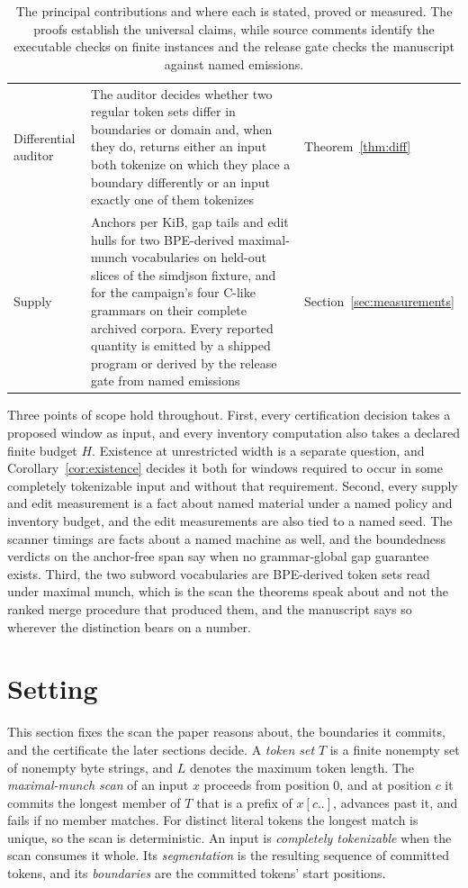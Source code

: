 \documentclass[11pt,a4paper]{article}
\theoremstyle{definition}
\theoremstyle{plain}
\begin{document}
\begin{table}[!htbp]
\begin{tabular}{L{2.9cm}L{8.4cm}L{3.3cm}}
\addlinespace
Differential auditor & The auditor decides whether two regular token sets differ in boundaries or domain and, when
they do, returns either an input both tokenize on which they place a boundary differently or an input exactly one of
them tokenizes &
Theorem~\ref{thm:diff} \\
\addlinespace
Supply & Anchors per KiB, gap tails and edit hulls for two BPE-derived maximal-munch vocabularies on held-out
slices of the simdjson fixture, and for the campaign's four C-like grammars on their complete archived corpora. Every
reported quantity is emitted by a shipped program or derived by the release gate from named emissions &
Section~\ref{sec:measurements} \\
\bottomrule
\end{tabular}
\caption{The principal contributions and where each is stated, proved or measured. The proofs establish the universal
claims, while source comments identify the executable checks on finite instances and the release gate checks the
manuscript against named emissions.}
\label{tab:results}
\end{table}

Three points of scope hold throughout. First, every certification decision takes a proposed window as input, and every
inventory computation also takes a declared finite budget $H$. Existence at unrestricted width is a separate question,
and Corollary~\ref{cor:existence} decides it both for windows required to occur in some completely tokenizable input and
without that requirement. Second, every supply and edit measurement is a fact about named material under a named policy
and inventory budget, and the edit measurements are also tied to a named seed. The scanner timings are facts about a
named machine as well, and the boundedness verdicts on the anchor-free span say when no grammar-global gap guarantee
exists. Third, the two subword vocabularies are BPE-derived token sets read under maximal munch, which is the scan the
theorems speak about and not the ranked merge procedure that produced them, and the manuscript says so wherever the
distinction bears on a number.

\FloatBarrier
\section{Setting}\label{sec:setting}

This section fixes the scan the paper reasons about, the boundaries it commits, and the certificate the later sections
decide. A \emph{token set} $T$ is a finite nonempty set of nonempty byte strings, and $L$ denotes the maximum token
length. The \emph{maximal-munch scan} of an input $x$ proceeds from position $0$, and at position $c$ it commits the
longest member of $T$ that is a prefix of $x[c..]$, advances past it, and fails if no member matches. For distinct
literal tokens the longest match is unique, so the scan is deterministic. An input is \emph{completely tokenizable} when
the scan consumes it whole. Its \emph{segmentation} is the resulting sequence of committed tokens, and its
\emph{boundaries} are the committed tokens' start positions.
\end{document}
